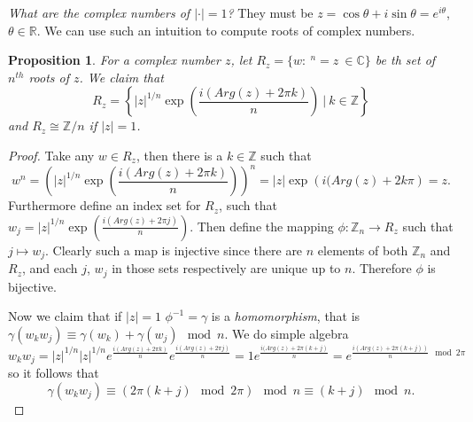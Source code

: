\documentclass[letter]{article}
\newtheorem{proposition}{Proposition}
\begin{document}
	\emph{What are the complex numbers of $|\cdot| = 1$?} They must be $z = \cos \theta + i\sin \theta = e^{i\theta}$, $\theta \in \mathbb{R}$.
	We can use such an intuition to compute roots of complex numbers. 
	\begin{proposition}
		For a complex number $z$, let $R_z = \{w :\ ^n = z\ \in \mathbb{C}\}$ be th set of $n^{th}$ roots of $z$. We claim that
		\begin{equation*}
			R_z = \left\{|z|^{1/n}\exp\left(\frac{i(Arg(z) + 2\pi k)}{n}\right)\ \Big|\ k \in \mathbb{Z}\right\} 
		\end{equation*}
		and $R_z \cong \mathbb{Z}/n$ if $|z| = 1$.
	\end{proposition}
	\begin{proof}
		Take any $w \in R_z$, then there is a $k \in \mathbb{Z}$ such that
		\begin{equation*}
			w^n = \left(|z|^{1/n}\exp\left(\frac{i(Arg(z) + 2\pi k)}{n}\right)\right)^n = |z|\exp\left(i(Arg(z) + 2k\pi\right) = z.
		\end{equation*}
		Furthermore define an index set for $R_z$, such that $w_j = |z|^{1/n}\exp\left(\frac{i(Arg(z) + 2\pi j)}{n}\right)$. Then
		define the mapping $\phi: \mathbb{Z}_n \to R_z$ such that $j \mapsto w_j$. Clearly such a map is injective since there are $n$
		elements of both $\mathbb{Z}_n$ and $R_z$, and each $j$, $w_j$ in those sets respectively are unique up to $n$. Therefore $\phi$ is bijective.

		Now we claim that if $|z| = 1$ $\phi^{-1} = \gamma$ is a \emph{homomorphism}, that is $\gamma(w_kw_j) \equiv \gamma(w_k) + \gamma(w_j) \mod n$. We do simple algebra
		\begin{equation*}
			w_kw_j = |z|^{1/n}|z|^{1/n}e^{\frac{i(Arg(z) + 2\pi k)}{n}}e^{\frac{i(Arg(z) + 2\pi j)}{n}} = 1e^{\frac{i(Arg(z) + 2\pi (k+ j)}{n}} =e^{\frac{i(Arg(z) + 2\pi (k+ j))}{n} \mod 2\pi} 
		\end{equation*}
		so it follows that
		\begin{equation*}
			\gamma(w_kw_j) \equiv (2\pi(k + j) \mod 2\pi) \mod n \equiv (k + j) \mod n.
		\end{equation*}

	\end{proof}



\end{document}

